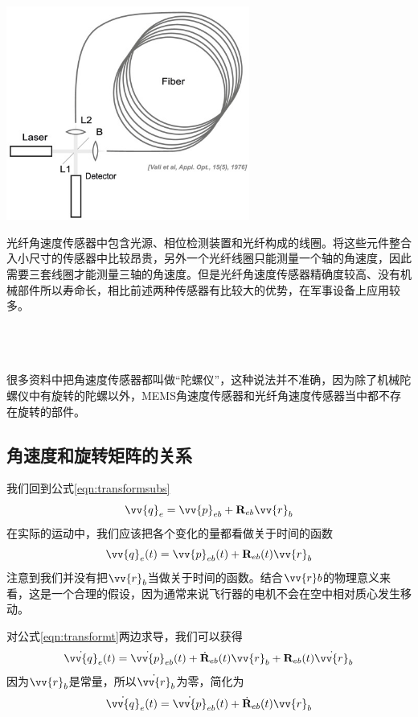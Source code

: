 \documentclass[11pt]{article}
\begin{document}
\begin{center}
\includegraphics[width=0.6\textwidth]{images/sagnaceffect.jpg}
\end{center}

光纤角速度传感器中包含光源、相位检测装置和光纤构成的线圈。将这些元件整合入小尺寸的传感器中比较昂贵，另外一个光纤线圈只能测量一个轴的角速度，因此需要三套线圈才能测量三轴的角速度。但是光纤角速度传感器精确度较高、没有机械部件所以寿命长，相比前述两种传感器有比较大的优势，在军事设备上应用较多。

\ \\
\ \\
\ \\

很多资料中把角速度传感器都叫做“陀螺仪”，这种说法并不准确，因为除了机械陀螺仪中有旋转的陀螺以外，MEMS角速度传感器和光纤角速度传感器当中都不存在旋转的部件。

\subsection{角速度和旋转矩阵的关系}
我们回到公式\ref{eqn:transformsubs}
$$
\vv{q}_{e} = \vv{p}_{eb} + {\bf R}_{eb}\vv{r}_b
$$
在实际的运动中，我们应该把各个变化的量都看做关于时间的函数
\begin{equation}\label{eqn:transformt}
\vv{q}_{e}(t) = \vv{p}_{eb}(t) + {\bf R}_{eb}(t)\vv{r}_b
\end{equation}
注意到我们并没有把$\vv{r}_b$当做关于时间的函数。结合$\vv{r}b$的物理意义来看，这是一个合理的假设，因为通常来说飞行器的电机不会在空中相对质心发生移动。

对公式\ref{eqn:transformt}两边求导，我们可以获得
\begin{equation*}
\dot{\vv{q}}_{e}(t) =\dot{ \vv{p}}_{eb}(t) + \dot{{\bf R}}_{eb}(t)\vv{r}_b +{\bf R}_{eb}(t)  \dot{\vv{r}}_b
\end{equation*}
因为$\vv{r}_b$是常量，所以$\dot{\vv{r}}_{b}$为零，简化为
\begin{equation*}
\dot{\vv{q}}_{e}(t) =\dot{ \vv{p}}_{eb}(t) + \dot{{\bf R}}_{eb}(t)\vv{r}_b
\end{equation*}
\end{document}
